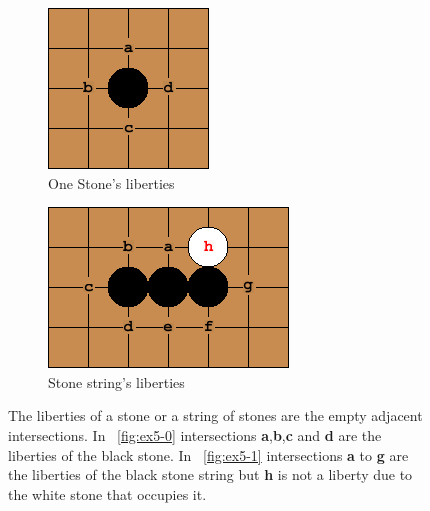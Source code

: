 \documentclass{l4proj}
\newcommand{\bo}[1]{\textbf{#1}}
\begin{document}
\begin{figure}[!ht]
\centering
\begin{subfigure}[b]{0.20\textwidth}
\includegraphics[width=\textwidth]{ex/Ex5-0.png}
\caption{One Stone's liberties}
\label{fig:ex5-0}
\end{subfigure}\qquad\qquad
\begin{subfigure}[b]{0.30\textwidth}
\includegraphics[width=\textwidth]{ex/Ex5-1.png}
\caption{Stone string's liberties}
\label{fig:ex5-1}
\end{subfigure}
\caption{The liberties of a stone or a string of stones are the empty adjacent intersections.  In ~\autoref{fig:ex5-0} intersections \bo{a},\bo{b},\bo{c} and \bo{d} are the liberties of the black stone.
In ~\autoref{fig:ex5-1} intersections \bo{a} to \bo{g} are the liberties of the black stone string but \bo{h} is not a liberty due to the white stone that occupies it.}
\label{fig:ex5}
\end{figure}
\end{document}
